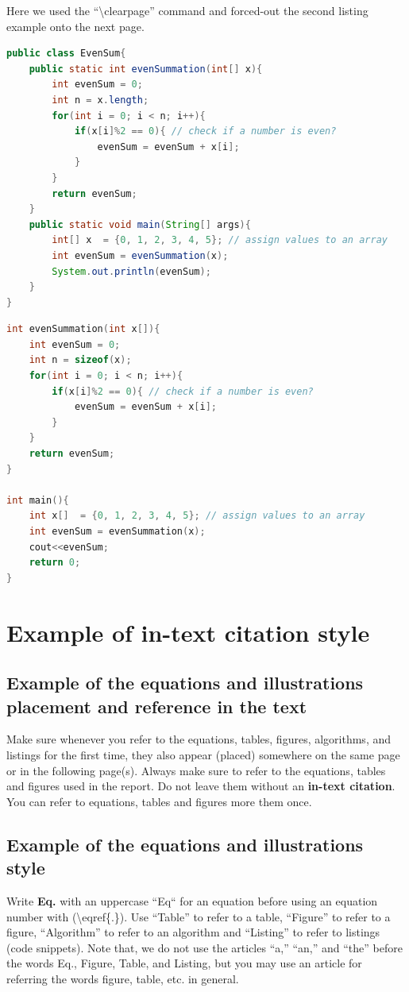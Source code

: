 Here we used  the ``\textbackslash clearpage'' command and forced-out the second listing example onto the next page. 
\clearpage  %
\begin{lstlisting}[language=Java, caption={Code snippet in \LaTeX ~and  this is a Java code example}, label=list:java_code_ex]
public class EvenSum{ 
    public static int evenSummation(int[] x){
        int evenSum = 0;
        int n = x.length;
        for(int i = 0; i < n; i++){
            if(x[i]%2 == 0){ // check if a number is even?
                evenSum = evenSum + x[i];
            }
        }
        return evenSum;     
    }
    public static void main(String[] args){ 
        int[] x  = {0, 1, 2, 3, 4, 5}; // assign values to an array
        int evenSum = evenSummation(x);
        System.out.println(evenSum);
    } 
} 
\end{lstlisting}


\begin{lstlisting}[language=C, caption={Code snippet in \LaTeX ~and  this is a C/C++ code example}, label=list:cpp_code_ex]
int evenSummation(int x[]){
    int evenSum = 0;
    int n = sizeof(x);
    for(int i = 0; i < n; i++){
        if(x[i]%2 == 0){ // check if a number is even?
            evenSum = evenSum + x[i];
    	}
    }
    return evenSum;     
}

int main(){
    int x[]  = {0, 1, 2, 3, 4, 5}; // assign values to an array
    int evenSum = evenSummation(x);
    cout<<evenSum;
    return 0;
}
\end{lstlisting}



\section{Example of in-text citation style}
\subsection{Example of the equations and illustrations placement and reference in the text}
Make sure whenever you refer to the equations, tables, figures, algorithms,  and listings for the first time, they also appear (placed) somewhere on the same page or in the following page(s). Always make sure to refer to the equations, tables and figures used in the report. Do not leave them without an \textbf{in-text citation}. You can refer to equations, tables and figures more them once.

\subsection{Example of the equations and illustrations style}
Write \textbf{Eq.} with an uppercase ``Eq`` for an equation before using an equation number with (\textbackslash eqref\{.\}). Use ``Table'' to refer to a table, ``Figure'' to refer to a figure, ``Algorithm'' to refer to an algorithm and ``Listing'' to refer to listings (code snippets). Note that, we do not use the articles ``a,'' ``an,'' and ``the'' before the words Eq., Figure, Table, and Listing, but you may use an article for referring the words figure, table, etc. in general.

